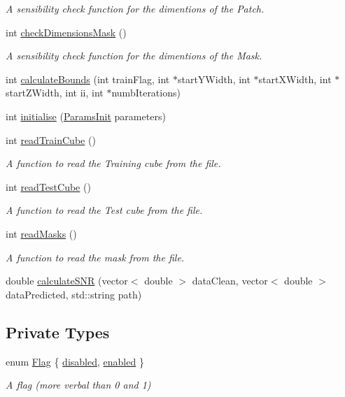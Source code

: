 \begin{DoxyCompactItemize}
\begin{DoxyCompactList}\small\item\em A sensibility check function for the dimentions of the Patch. \end{DoxyCompactList}\item 
int \hyperlink{classDataReader_af6056c45ad47ad45ab8e6663280e55fc}{check\+Dimensions\+Mask} ()
\begin{DoxyCompactList}\small\item\em A sensibility check function for the dimentions of the Mask. \end{DoxyCompactList}\item 
int \hyperlink{classDataReader_a28b365a9335395e679c56074c56262d3}{calculate\+Bounds} (int train\+Flag, int $\ast$start\+Y\+Width, int $\ast$start\+X\+Width, int $\ast$start\+Z\+Width, int ii, int $\ast$numb\+Iterations)
\item 
int \hyperlink{classDataReader_afb618b0fafa0acb2365509a122f3602a}{initialise} (\hyperlink{classParamsInit}{Params\+Init} parameters)
\item 
int \hyperlink{classDataReader_aefcb38bd08e3941a328ff64aa558e7a8}{read\+Train\+Cube} ()
\begin{DoxyCompactList}\small\item\em A function to read the Training cube from the file. \end{DoxyCompactList}\item 
int \hyperlink{classDataReader_a6fda577c7a39231af8ff7bad9821dd94}{read\+Test\+Cube} ()
\begin{DoxyCompactList}\small\item\em A function to read the Test cube from the file. \end{DoxyCompactList}\item 
int \hyperlink{classDataReader_abad2eb24821cb6097c7eb9e017d0123f}{read\+Masks} ()
\begin{DoxyCompactList}\small\item\em A function to read the mask from the file. \end{DoxyCompactList}\item 
double \hyperlink{classDataReader_a1384d31286da6be6715687ecf5ebbc58}{calculate\+S\+NR} (vector$<$ double $>$ data\+Clean, vector$<$ double $>$ data\+Predicted, std\+::string path)
\end{DoxyCompactItemize}
\subsection*{Private Types}
\begin{DoxyCompactItemize}
\item 
enum \hyperlink{classDataReader_a4d7ac2e743b4d00d62ce3ac86dd35f76}{Flag} \{ \hyperlink{classDataReader_a4d7ac2e743b4d00d62ce3ac86dd35f76aac0022634ec9e261a5f03eebe88fed11}{disabled}, 
\hyperlink{classDataReader_a4d7ac2e743b4d00d62ce3ac86dd35f76a469181e07fca749b48a38f7c7ed9b619}{enabled}
 \}\begin{DoxyCompactList}\small\item\em A flag (more verbal than 0 and 1) \end{DoxyCompactList}
\end{DoxyCompactItemize}
